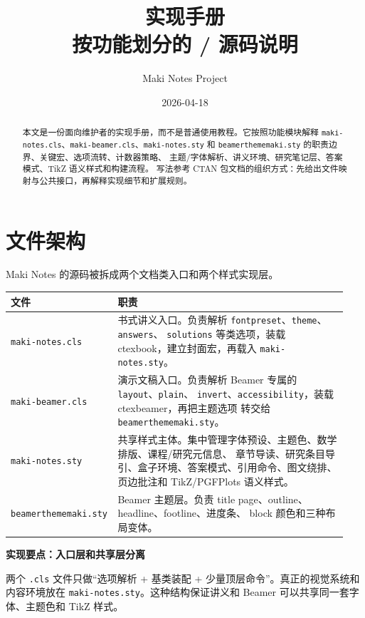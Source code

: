 \documentclass[a4paper,11pt]{ltxdoc}
\title{\Maki{} 实现手册\\
  \large 按功能划分的 \mfile{.cls}/\mfile{.sty} 源码说明}
\author{Maki Notes Project}
\date{2026-04-18}
\newcommand{\mfile}[1]{\texttt{#1}}
\newcommand{\mcls}[1]{\textsf{#1}}
\newcommand{\mopt}[1]{\texttt{#1}}
\newcommand{\Maki}{\textsf{Maki Notes}}
\newenvironment{implementation}[1]
  {\par\medskip\noindent\textbf{\color{MakiBlue}实现要点：#1}\par\smallskip}
  {\par\medskip}
\begin{document}
\maketitle
\tableofcontents

\begin{abstract}
本文是一份面向维护者的实现手册，而不是普通使用教程。它按照功能模块解释
\mfile{maki-notes.cls}、\mfile{maki-beamer.cls}、\mfile{maki-notes.sty}
和 \mfile{beamerthememaki.sty} 的职责边界、关键宏、选项流转、计数器策略、
主题/字体解析、讲义环境、研究笔记层、答案模式、TikZ 语义样式和构建流程。
写法参考 CTAN 包文档的组织方式：先给出文件映射与公共接口，再解释实现细节和扩展规则。
\end{abstract}

\section{文件架构}

\Maki{} 的源码被拆成两个文档类入口和两个样式实现层。

\begin{longtable}{@{}p{0.26\linewidth}p{0.68\linewidth}@{}}
\toprule
文件 & 职责 \\
\midrule
\mfile{maki-notes.cls} &
书式讲义入口。负责解析 \mopt{fontpreset}、\mopt{theme}、\mopt{answers}、
\mopt{solutions} 等类选项，装载 \mcls{ctexbook}，建立封面宏，再载入
\mfile{maki-notes.sty}。\\
\mfile{maki-beamer.cls} &
演示文稿入口。负责解析 Beamer 专属的 \mopt{layout}、\mopt{plain}、
\mopt{invert}、\mopt{accessibility}，装载 \mcls{ctexbeamer}，再把主题选项
转交给 \mfile{beamerthememaki.sty}。\\
\mfile{maki-notes.sty} &
共享样式主体。集中管理字体预设、主题色、数学排版、课程/研究元信息、
章节导读、研究条目导引、盒子环境、答案模式、引用命令、图文绕排、
页边批注和 TikZ/PGFPlots 语义样式。\\
\mfile{beamerthememaki.sty} &
Beamer 主题层。负责 title page、outline、headline、footline、进度条、
block 颜色和三种布局变体。\\
\bottomrule
\end{longtable}

\begin{implementation}{入口层和共享层分离}
两个 \mfile{.cls} 文件只做“选项解析 + 基类装配 + 少量顶层命令”。真正的视觉系统和内容环境放在
\mfile{maki-notes.sty}。这种结构保证讲义和 Beamer 可以共享同一套字体、主题色和 TikZ 样式。
\end{implementation}
\end{document}
